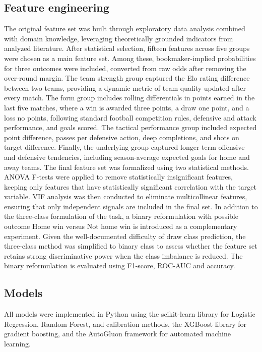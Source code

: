 \documentclass[conference]{IEEEtran}
\begin{document}
\subsection{Feature engineering}
The original feature set was built through exploratory data
analysis combined with domain knowledge, leveraging theoretically
grounded indicators from analyzed literature. After
statistical selection, fifteen features across five groups were
chosen as a main feature set. Among these, bookmaker-implied
probabilities for three outcomes were included, converted from
raw odds after removing the over-round margin. The team
strength group captured the Elo rating difference between two
teams, providing a dynamic metric of team quality updated
after every match. The form group includes rolling differentials
in points earned in the last five matches, where a win
is awarded three points, a draw one point, and a loss no
points, following standard football competition rules, defensive
and attack performance, and goals scored. The tactical
performance group included expected point difference, passes
per defensive action, deep completions, and shots on target
difference. Finally, the underlying group captured longer-term
offensive and defensive tendencies, including season-average
expected goals for home and away teams. The final feature
set was formalized using two statistical methods. ANOVA
F-tests were applied to remove statistically insignificant features,
keeping only features that have statistically significant
correlation with the target variable. VIF analysis was then
conducted to eliminate multicollinear features, ensuring that
only independent signals are included in the final set. In
addition to the three-class formulation of the task, a binary
reformulation with possible outcome Home win versus Not
home win is introduced as a complementary experiment. Given
the well-documented difficulty of draw class prediction, the
three-class method was simplified to binary class to assess
whether the feature set retains strong discriminative power
when the class imbalance is reduced. The binary reformulation
is evaluated using F1-score, ROC-AUC and accuracy.

\subsection{Models}
All models were implemented in Python using the scikit-learn
library for Logistic Regression, Random Forest, and calibration
methods, the XGBoost library for gradient boosting, and the
AutoGluon framework for automated machine learning.
\end{document}
